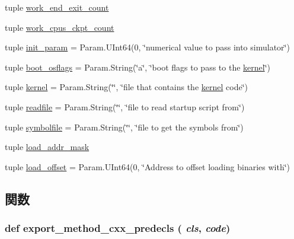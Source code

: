\begin{DoxyCompactItemize}
\item 
tuple \hyperlink{classSystem_1_1System_a56545cda6c4090e0fc3d5836bc6912bd}{work\_\-end\_\-exit\_\-count}
\item 
tuple \hyperlink{classSystem_1_1System_af88b3ed9c92ddf3321e4285196287311}{work\_\-cpus\_\-ckpt\_\-count}
\item 
tuple \hyperlink{classSystem_1_1System_a8f33794b9902debe332c255a67ee4118}{init\_\-param} = Param.UInt64(0, \char`\"{}numerical value to pass into simulator\char`\"{})
\item 
tuple \hyperlink{classSystem_1_1System_ae7ab063871afdab88e46403466e3078c}{boot\_\-osflags} = Param.String(\char`\"{}a\char`\"{}, \char`\"{}boot flags to pass to the \hyperlink{classSystem_1_1System_af88c6d996d5a7fc68d6f57bb1959c4cc}{kernel}\char`\"{})
\item 
tuple \hyperlink{classSystem_1_1System_af88c6d996d5a7fc68d6f57bb1959c4cc}{kernel} = Param.String(\char`\"{}\char`\"{}, \char`\"{}file that contains the \hyperlink{classSystem_1_1System_af88c6d996d5a7fc68d6f57bb1959c4cc}{kernel} code\char`\"{})
\item 
tuple \hyperlink{classSystem_1_1System_ab23383105beaef5f4d64f2ff0ef7f24c}{readfile} = Param.String(\char`\"{}\char`\"{}, \char`\"{}file to read startup script from\char`\"{})
\item 
tuple \hyperlink{classSystem_1_1System_a3001ef045b814fad6b1b3121c55bf301}{symbolfile} = Param.String(\char`\"{}\char`\"{}, \char`\"{}file to get the symbols from\char`\"{})
\item 
tuple \hyperlink{classSystem_1_1System_ae97427a4073448718c4d7c3df3b53143}{load\_\-addr\_\-mask}
\item 
tuple \hyperlink{classSystem_1_1System_a3a0297171c7d57f0219cd11fc1e6891f}{load\_\-offset} = Param.UInt64(0, \char`\"{}Address to offset loading binaries with\char`\"{})
\end{DoxyCompactItemize}


\subsection{関数}
\hypertarget{classSystem_1_1System_a4c94af862ca1bc3ebde2094d5e778ef1}{
\subsubsection[{export\_\-method\_\-cxx\_\-predecls}]{\setlength{\rightskip}{0pt plus 5cm}def export\_\-method\_\-cxx\_\-predecls ( {\em cls}, \/   {\em code})}}
\label{classSystem_1_1System_a4c94af862ca1bc3ebde2094d5e778ef1}



